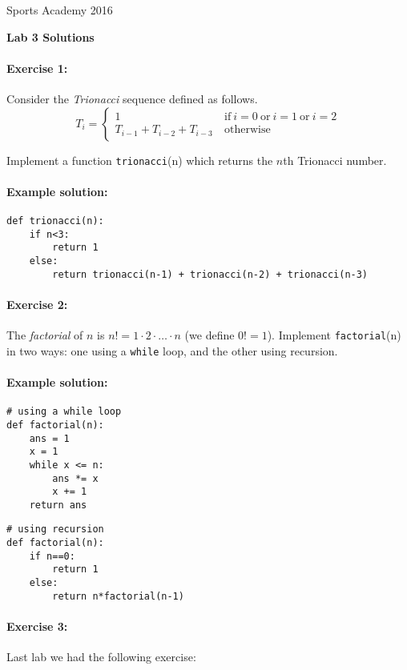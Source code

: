 \documentclass[11pt]{article}
\newlength{\toppush}
\newcommand{\htitle}[2]{\noindent\vspace*{-\toppush}\newline\parbox{6.5in}
 {\large Sports Academy \hfill #1\newline
\hspace*{\fill}{\bf Algorithms and Programming for High Schoolers} \hspace*{\fill} \newline
\mbox{}\hrulefill\mbox{}}\vspace*{1ex}\mbox{}\newline
\begin{center}{\Large\bf #2}\end{center}}
\begin{document}
\htitle{2016}{Lab 3 Solutions}

\paragraph{Exercise 1:}
Consider the {\em Trionacci} sequence defined as follows.
$$
T_i = \begin{cases} 1 \ &
  \mathrm{if}\ i=0\ \mathrm{or}\ i = 1 \ \mathrm{or}\ i=2
\\ T_{i-1} + T_{i-2} + T_{i-3} \
&\mathrm{otherwise} \end{cases}
$$

Implement a function \texttt{trionacci}(n) which returns the $n$th
Trionacci number.

\paragraph{Example solution:}
\begin{verbatim}
def trionacci(n):
    if n<3:
        return 1
    else:
        return trionacci(n-1) + trionacci(n-2) + trionacci(n-3)
\end{verbatim}

\paragraph{Exercise 2:}
The {\em factorial} of $n$ is $n! = 1\cdot 2 \cdot \ldots \cdot n$ (we
define $0! = 1$).
Implement \texttt{factorial}(n) in two ways: one using a
\texttt{while} loop, and the other using recursion.

\paragraph{Example solution:}
\begin{verbatim}
# using a while loop
def factorial(n):
    ans = 1
    x = 1
    while x <= n:
        ans *= x
        x += 1
    return ans
\end{verbatim}

\begin{verbatim}
# using recursion
def factorial(n):
    if n==0:
        return 1
    else:
        return n*factorial(n-1)
\end{verbatim}

\paragraph{Exercise 3:}
Last lab we had the following exercise:
\end{document}
